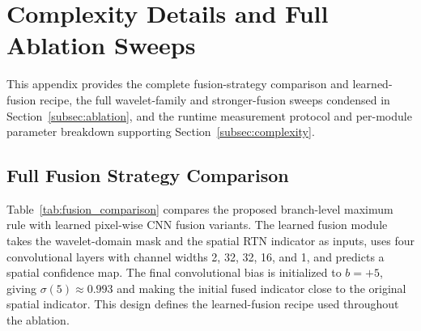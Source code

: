 \section{Complexity Details and Full Ablation Sweeps}\label{app:complexity_details}

This appendix provides the complete fusion-strategy comparison and learned-fusion recipe, the full wavelet-family and stronger-fusion sweeps condensed in Section~\ref{subsec:ablation}, and the runtime measurement protocol and per-module parameter breakdown supporting Section~\ref{subsec:complexity}.

\subsection{Full Fusion Strategy Comparison}\label{subsec:fusion_analysis}

Table~\ref{tab:fusion_comparison} compares the proposed branch-level maximum rule with learned pixel-wise CNN fusion variants. The learned fusion module takes the wavelet-domain mask and the spatial RTN indicator as inputs, uses four convolutional layers with channel widths 2, 32, 32, 16, and 1, and predicts a spatial confidence map. The final convolutional bias is initialized to $b=+5$, giving $\sigma(5)\approx0.993$ and making the initial fused indicator close to the original spatial indicator. This design defines the learned-fusion recipe used throughout the ablation.

